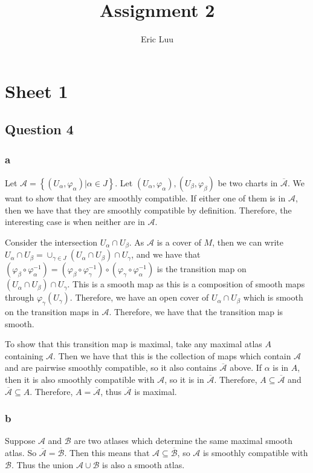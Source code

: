 \documentclass{article}
\title{Assignment 2}
\author{Eric Luu}
\theoremstyle{definition}
\numberwithin{theorem}{section}
\numberwithin{equation}{section}
\newcommand{\atlas}{\mathcal{A}}
\begin{document}
\section{Sheet 1}

\subsection{Question 4}
\subsubsection{a}
Let $\atlas = \left\{(U_\alpha, \varphi_\alpha) | \alpha \in J\right\}$. Let $(U_\alpha, \varphi_\alpha), (U_\beta, \varphi_\beta)$ be two charts in $\overline{\atlas}$. We want to show that they are smoothly compatible. If either one of them is in $\atlas$, then we have that they are smoothly compatible by definition. Therefore, the interesting case is when neither are in $\atlas$. 

Consider the intersection $U_\alpha \cap U_\beta$. As $\atlas$ is a cover of $M$, then we can write $U_\alpha \cap U_\beta = \cup_{\gamma \in J} (U_\alpha \cap U_\beta) \cap U_\gamma$, and we have that $(\varphi_\beta \circ \varphi_\alpha^{-1}) = (\varphi_\beta \circ \varphi_\gamma^{-1}) \circ (\varphi_\gamma \circ \varphi_\alpha^{-1})$ is the transition map on $(U_\alpha \cap U_\beta) \cap U_\gamma$. This is a smooth map as this is a composition of smooth maps through $\varphi_\gamma(U_\gamma)$. Therefore, we have an open cover of $U_\alpha \cap U_\beta$ which is smooth on the transition maps in $\atlas$. Therefore, we have that the transition map is smooth.

To show that this transition map is maximal, take any maximal atlas $A$ containing $\atlas$. Then we have that this is the collection of maps which contain $\atlas$ and are pairwise smoothly compatible, so it also contains $\overline{\atlas}$ above. If $\alpha$ is in $A$, then it is also smoothly compatible with $\atlas$, so it is in $\overline{\atlas}$. Therefore, $A \subseteq \overline{\atlas}$ and $\overline{\atlas} \subseteq A$. Therefore, $A = \overline{\atlas}$, thus $\overline{\atlas}$ is maximal. 
\subsubsection{b}

Suppose $\mathcal{A}$ and $\mathcal{B}$ are two atlases which determine the same maximal smooth atlas. So $\overline{\mathcal{A}} = \overline{\mathcal{B}}$. Then this means that $\mathcal{A} \subseteq \overline{\mathcal{B}}$, so $\mathcal{A}$ is smoothly compatible with $\mathcal{B}$. Thus the union $\mathcal{A} \cup \mathcal{B}$ is also a smooth atlas. 
\end{document}
